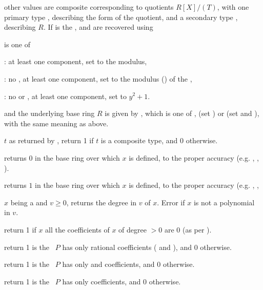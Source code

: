 \item other values are composite corresponding to quotients $R[X]/(T)$, with
one primary type , describing the form of the quotient,
and a secondary type , describing $R$. If  is the
,  and  are recovered using


 is one of

: at least one  component,
set  to the modulus,

: no , at least one  component,
set  to the modulus () of the ,

: no  or , at least one 
component, set  to $y^2 + 1$.

and the underlying base ring $R$ is given by , which
is one of ,  (set ) or 
(set  and ), with the same meaning
as above.

 $t$ as returned by ,
return 1 if $t$ is a composite type, and 0 otherwise.

 returns $0$ in the base ring over which $x$
is defined, to the proper accuracy (e.g. , ,
).

 returns $1$ in the base ring over which $x$
is defined, to the proper accuracy (e.g. , ,


 $x$ being a  and $v \geq 0$,
returns the degree in $v$ of $x$. Error if $x$ is not a polynomial in $v$.

 return 1 if $x$ all the coefficients of
$x$ of degree $> 0$ are $0$ (as per ).

 return 1 is the ~$P$ has only
rational coefficients ( and ), and 0 otherwise.

 return 1 is the ~$P$ has only
 and  coefficients, and 0 otherwise.

 return 1 is the ~$P$ has only
 coefficients, and 0 otherwise.

